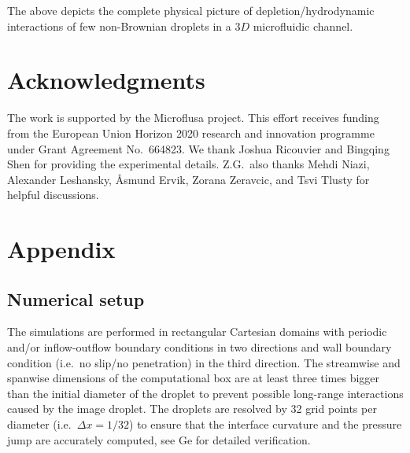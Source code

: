 The above depicts the complete physical picture of depletion/hydrodynamic interactions of few non-Brownian droplets in a $3D$ microfluidic channel. 

\section*{Acknowledgments}

The work is supported by the Microflusa project. This effort receives funding from the European Union Horizon 2020 research and innovation programme under Grant Agreement No.\ 664823.
We thank Joshua Ricouvier and Bingqing Shen for providing the experimental details. Z.G.\ also thanks Mehdi Niazi, Alexander Leshansky, \AA smund Ervik, Zorana Zeravcic, and Tsvi Tlusty for helpful discussions.


\section*{Appendix}
\renewcommand\thesubsection{\Alph{subsection}} %

\subsection{Numerical setup} \label{app:numerics}

The simulations are performed in rectangular Cartesian domains with periodic and/or inflow-outflow boundary conditions in two directions and wall boundary condition (i.e.\ no slip/no penetration) in the third direction. The streamwise and spanwise dimensions of the computational box are at least three times bigger than the initial diameter of the droplet to prevent possible long-range interactions caused by the image droplet. The droplets are resolved by 32 grid points per diameter (i.e.\ $\Delta x=1/32$) to ensure that the interface curvature and the pressure jump are accurately computed, see Ge \etal \cite{ICLS} for detailed verification.

